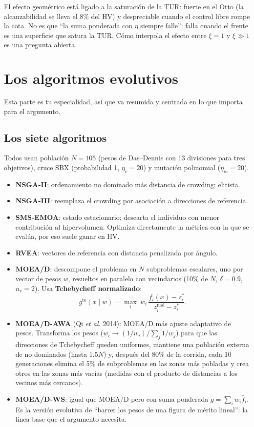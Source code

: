 \begin{idea}
El efecto geométrico está ligado a la saturación de la TUR: fuerte en el Otto (la alcanzabilidad se
lleva el 8\% del HV) y despreciable cuando el control libre rompe la cota. No es que ``la
suma ponderada con $\eta$ siempre falle'': falla cuando el frente es una superficie que satura la
TUR. Cómo interpola el efecto entre $\xi = 1$ y $\xi \gg 1$ es una pregunta abierta.
\end{idea}

\section{Los algoritmos evolutivos}
\label{sec:algos}

Esta parte es tu especialidad, así que va resumida y centrada en lo que importa para el argumento.

\subsection{Los siete algoritmos}

Todos usan población $N = 105$ (pesos de Das--Dennis con 13 divisiones para tres objetivos), cruce
SBX (probabilidad 1, $\eta_c = 20$) y mutación polinomial ($\eta_m = 20$).
\begin{itemize}
\item \textbf{NSGA-II}: ordenamiento no dominado más distancia de crowding; elitista.
\item \textbf{NSGA-III}: reemplaza el crowding por asociación a direcciones de referencia.
\item \textbf{SMS-EMOA}: estado estacionario; descarta el individuo con menor contribución al
  hipervolumen. Optimiza directamente la métrica con la que se evalúa, por eso suele ganar en HV.
\item \textbf{RVEA}: vectores de referencia con distancia penalizada por ángulo.
\item \textbf{MOEA/D}: descompone el problema en $N$ subproblemas escalares, uno por vector de pesos
  $w$, resueltos en paralelo con vecindarios (10\% de $N$, $\delta = 0.9$, $n_r = 2$). Usa
  \textbf{Tchebycheff normalizado}:
  \[ g^{\mathrm{te}}(x\mid w) = \max_i\ w_i\,\frac{f_i(x) - z_i^*}{z_i^{\mathrm{nad}} - z_i^*}. \]
\item \textbf{MOEA/D-AWA} (Qi \emph{et al.} 2014): MOEA/D más ajuste adaptativo de pesos. Transforma
  los pesos ($w_i \to (1/w_i)/\sum_j 1/w_j$) para que las direcciones de Tchebycheff queden uniformes,
  mantiene una población externa de no dominados (hasta $1.5N$) y, después del 80\% de la corrida,
  cada 10 generaciones elimina el 5\% de subproblemas en las zonas más pobladas y crea otros en las
  zonas más vacías (medidas con el producto de distancias a los vecinos más cercanos).
\item \textbf{MOEA/D-WS}: igual que MOEA/D pero con suma ponderada $g = \sum_i w_i\bar f_i$. Es la
  versión evolutiva de ``barrer los pesos de una figura de mérito lineal'': la línea base que el
  argumento necesita.
\end{itemize}

